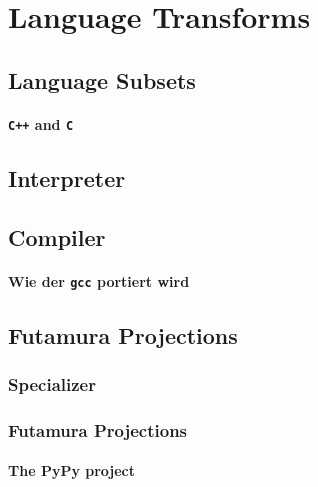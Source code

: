 \section{Language Transforms} %
\label{sec:transforms}
\subsection{Language Subsets} %
\label{sub:Language Subsets}
\paragraph{{\tt C++}  and {\tt C} } %
\label{par:Cpp and C}

\subsection{Interpreter} %
\label{sub:Interpreter}

\subsection{Compiler} %
\label{sub:Compiler}
\paragraph{Wie der {\tt gcc} portiert wird} %
\label{par:Wie der gcc portiert wird}

\subsection{Futamura Projections} %
\label{sub:Futamura}
\subsubsection{Specializer} %
\label{ssub:Specializer}
\subsubsection{Futamura Projections} %
\label{ssub:Futamura Projections}

\paragraph{The PyPy project} %
\label{par:The PyPy project}


